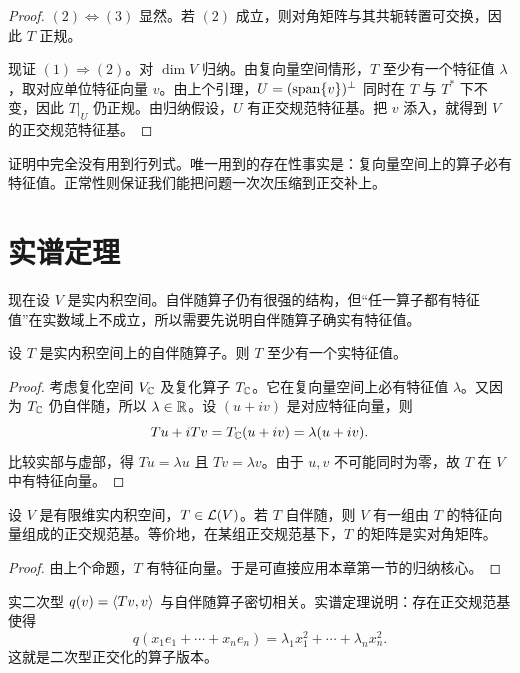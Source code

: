 \begin{proof}
$(2)\Leftrightarrow(3)$ 显然。若 $(2)$ 成立，则对角矩阵与其共轭转置可交换，因此 $T$ 正规。

现证 $(1)\Rightarrow(2)$。对 $\dim V$ 归纳。由复向量空间情形，$T$ 至少有一个特征值 $\lambda$，取对应单位特征向量 $v$。由上个引理，$U=(\operatorname{span}\{v\})^\perp$ 同时在 $T$ 与 $T^*$ 下不变，因此 $T|_U$ 仍正规。由归纳假设，$U$ 有正交规范特征基。把 $v$ 添入，就得到 $V$ 的正交规范特征基。
\end{proof}

\begin{remark}
证明中完全没有用到行列式。唯一用到的存在性事实是：复向量空间上的算子必有特征值。正常性则保证我们能把问题一次次压缩到正交补上。
\end{remark}

\section{实谱定理}

现在设 $V$ 是实内积空间。自伴随算子仍有很强的结构，但“任一算子都有特征值”在实数域上不成立，所以需要先说明自伴随算子确实有特征值。

\begin{proposition}
设 $T$ 是实内积空间上的自伴随算子。则 $T$ 至少有一个实特征值。
\end{proposition}

\begin{proof}
考虑复化空间 $V_{\mathbb{C}}$ 及复化算子 $T_{\mathbb{C}}$。它在复向量空间上必有特征值 $\lambda$。又因为 $T_{\mathbb{C}}$ 仍自伴随，所以 $\lambda\in\mathbb{R}$。设 $(u+iv)$ 是对应特征向量，则
\[
T u+iTv=T_{\mathbb{C}}(u+iv)=\lambda(u+iv).
\]
比较实部与虚部，得 $Tu=\lambda u$ 且 $Tv=\lambda v$。由于 $u,v$ 不可能同时为零，故 $T$ 在 $V$ 中有特征向量。
\end{proof}

\begin{theorem}[实谱定理]
设 $V$ 是有限维实内积空间，$T\in\mathcal{L}(V)$。若 $T$ 自伴随，则 $V$ 有一组由 $T$ 的特征向量组成的正交规范基。等价地，在某组正交规范基下，$T$ 的矩阵是实对角矩阵。
\end{theorem}

\begin{proof}
由上个命题，$T$ 有特征向量。于是可直接应用本章第一节的归纳核心。
\end{proof}

\begin{example}
实二次型 $q(v)=\langle Tv, v \rangle$ 与自伴随算子密切相关。实谱定理说明：存在正交规范基使得
\[
q(x_1e_1+\cdots+x_ne_n)=\lambda_1x_1^2+\cdots+\lambda_nx_n^2.
\]
这就是二次型正交化的算子版本。
\end{example}

